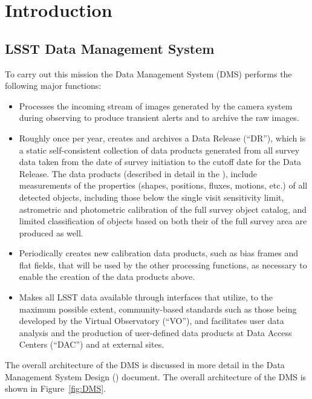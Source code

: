 \section{Introduction}

\subsection{LSST Data Management System}

To carry out this mission the Data Management System (DMS) performs the following major functions:

\begin{itemize}
\item Processes the incoming stream of images generated by the camera
  system during observing to produce transient alerts and to archive
  the raw images.

\item Roughly once per year, creates and archives a Data Release (``DR''),
  which is a static self-consistent collection of data products
  generated from all survey data taken from the date of survey
  initiation to the cutoff date for the Data Release. The data
  products (described in detail in the \DPDD), include measurements of
  the properties (shapes, positions, fluxes, motions, etc.) of all detected
  objects, including those below the single visit sensitivity limit,
  astrometric and photometric calibration of the full survey object
  catalog, and limited classification of objects based on both their
  of the full survey area are produced as well.

\item Periodically creates new calibration data products, such as bias
  frames and flat fields, that will be used by the other processing
  functions, as necessary to enable the creation of the data products above.

\item Makes all LSST data available through interfaces that utilize,
  to the maximum possible extent, community-based standards such as those
  being developed by the Virtual Observatory (``VO''), and facilitates user
  data analysis and the production of user-defined data products at Data
  Access Centers (``DAC'') and at external sites.
\end{itemize}

The overall architecture of the DMS is discussed in more detail in the Data Management System Design (\DMSD) document. The overall architecture of the DMS is shown in Figure~\ref{fig:DMS}.

